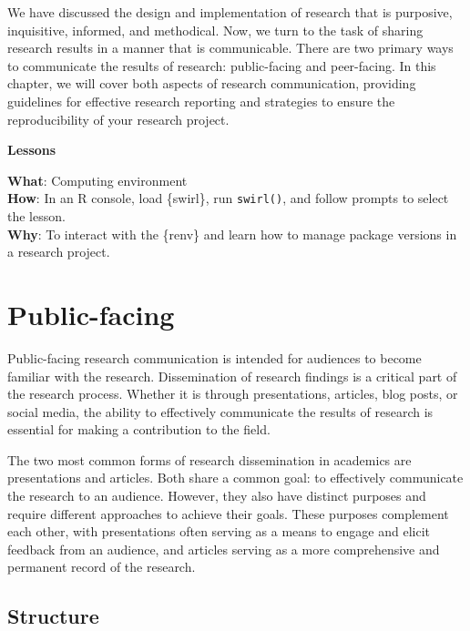 \documentclass[
  letterpaper,
  krantz1]{latex/krantz-mod}
\theoremstyle{definition}
\theoremstyle{definition}
\theoremstyle{remark}
\begin{document}
We have discussed the design and implementation of research that is
purposive, inquisitive, informed, and methodical. Now, we turn to the
task of sharing research results in a manner that is communicable. There
are two primary ways to communicate the results of research:
public-facing and peer-facing. In this chapter, we will cover both
aspects of research communication, providing guidelines for effective
research reporting and strategies to ensure the reproducibility of your
research project.

\begin{tcolorbox}[enhanced jigsaw, leftrule=.75mm, colframe=quarto-callout-color-frame, left=2mm, colback=white, toprule=.15mm, breakable, arc=.35mm, opacityback=0, bottomrule=.15mm, rightrule=.15mm]

\textbf{ Lessons}

\textbf{What}: Computing environment\\
\textbf{How}: In an R console, load \{swirl\}, run \texttt{swirl()}, and
follow prompts to select the lesson.\\
\textbf{Why}: To interact with the \{renv\} and learn how to manage
package versions in a research project.

\end{tcolorbox}

\section{Public-facing}\label{sec-contribute-public-facing}

Public-facing research communication is intended for audiences to become
familiar with the research. Dissemination of research findings is a
critical part of the research process. Whether it is through
presentations, articles, blog posts, or social media, the ability to
effectively communicate the results of research is essential for making
a contribution to the field.

The two most common forms of research dissemination in academics are
presentations and articles. Both share a common goal: to effectively
communicate the research to an audience. However, they also have
distinct purposes and require different approaches to achieve their
goals. These purposes complement each other, with presentations often
serving as a means to engage and elicit feedback from an audience, and
articles serving as a more comprehensive and permanent record of the
research.

\subsection{Structure}\label{sec-contribute-public-structure}
\end{document}
